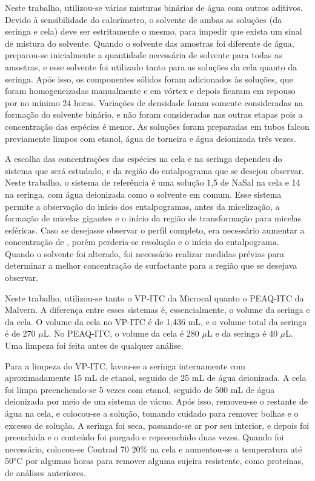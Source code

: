 		Neste trabalho, utilizou-se várias misturas binárias de água com outros aditivos. Devido à sensibilidade do calorímetro, o solvente de ambas as soluções (da seringa e cela) deve ser estritamente o mesmo, para impedir que exista um sinal de mistura do solvente. Quando o solvente das amostras foi diferente de água, preparou-se inicialmente a quantidade necessária de solvente para todas as amostras, e esse solvente foi utilizado tanto para as soluções da cela quanto da seringa. Após isso, os componentes sólidos foram adicionados às soluções, que foram homogeneizadas manualmente e em vórtex e depois ficaram em repouso por no mínimo 24 horas. Variações de densidade foram somente consideradas na formação do solvente binário, e não foram consideradas nas outras etapas pois a concentração das espécies é menor. As soluções foram preparadas em tubos falcon previamente limpos com etanol, água de torneira e água deionizada três vezes.
		
		A escolha das concentrações das espécies na cela e na seringa dependeu do sistema que será estudado, e da região do entalpograma que se desejou observar. Neste trabalho, o sistema de referência é uma solução 1,5 \mM{} de NaSal na cela e \TTAB{} 14 \mM{} na seringa, com água deionizada como o solvente em comum. Esse sistema permite a observação do início dos entalpogramas, antes da micelização, a formação de micelas gigantes e o início da região de transformação para micelas esféricas. Caso se desejasse observar o perfil completo, era necessário aumentar a concentração de \TTAB, porém perderia-se resolução e o início do entalpograma. Quando o solvente foi alterado, foi necessário realizar medidas prévias para determinar a melhor concentração de surfactante para a região que se desejava observar.
		
		Neste trabalho, utilizou-se tanto o VP-ITC da Microcal quanto o PEAQ-ITC da Malvern. A diferença entre esses sistemas é, essencialmente, o volume da seringa e da cela. O volume da cela no VP-ITC é de 1,436 mL, e o volume total da seringa é de 270 \(\mu\)L. No PEAQ-ITC, o volume da cela é 280 \(\mu\)L e da seringa é 40 \(\mu\)L. Uma limpeza foi feita antes de qualquer análise.
		
		Para a limpeza do VP-ITC, lavou-se a seringa internamente com aproximadamente 15 mL de etanol, seguido de 25 mL de água deionizada. A cela foi limpa preenchendo-se 5 vezes com etanol, seguido de 500 mL de água deionizada por meio de um sistema de vácuo. Após isso, removeu-se o restante de água na cela, e colocou-se a solução, tomando cuidado para remover bolhas e o excesso de solução. A seringa foi seca, passando-se ar por seu interior, e depois foi preenchida e o conteúdo foi purgado e repreenchido duas vezes. Quando foi necessário, colocou-se Contrad 70 20\% na cela e aumentou-se a temperatura até 50°C por algumas horas para remover alguma sujeira resistente, como proteínas, de análises anteriores.
		
